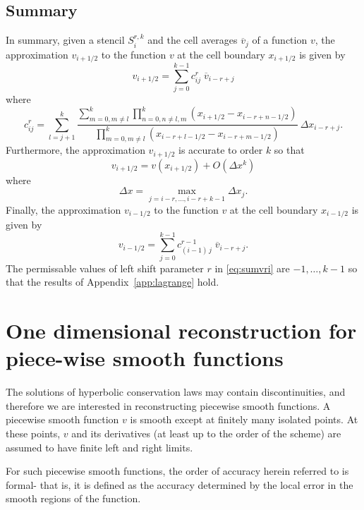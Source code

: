 \documentclass{article}
\newcommand{\xli}[0]{x_{i-1/2}}
\newcommand{\xri}[0]{x_{i+1/2}}
\newcommand{\vli}[0]{v_{i-1/2}}
\newcommand{\vri}[0]{v_{i+1/2}}
\numberwithin{equation}{section}
\begin{document}
\subsection{Summary}

In summary, given a stencil $S_i^{r,k}$ and the cell averages
$\overline{v}_j$ of a function $v$, the approximation $\vri$ to the
function $v$ at the cell boundary $\xri$ is given by
\begin{equation}
  \label{eq:sumvri}
  \vri = \sum_{j=0}^{k-1} c^r_{ij}\; \overline{v}_{i-r+j}
\end{equation}
where
\begin{equation}
  c^r_{ij} = \sum_{l=j+1}^k \frac{\sum_{m=0, m \neq l}^{k}
    \prod_{n=0, n \neq l,m}^{k} (\xri - x_{i-r+n-1/2})}{
    \prod_{m=0, m \neq l}^{k} (x_{i-r+l-1/2} - x_{i-r+m-1/2})}
    \ \Delta x_{i-r+j}.
\end{equation}
Furthermore, the approximation $\vri$ is accurate to order $k$ so that
\begin{equation*}
  \vri = v(\xri) + O(\Delta x^k)
\end{equation*}
where
\begin{equation*}
  \Delta x = \max_{j=i-r,\ldots,i-r+k-1} \Delta x_j.
\end{equation*}
Finally, the approximation $\vli$ to the function $v$ at the cell
boundary $\xli$ is given by
\begin{equation*}
  \vli = \sum_{j=0}^{k-1} c^{r-1}_{(i-1)\,j}\; \overline{v}_{i-r+j}.
\end{equation*}
The permissable values of left shift parameter $r$ in
\eqref{eq:sumvri} are $-1,\ldots,k-1$ so that the results of
Appendix~\ref{app:lagrange} hold.

\newpage
\section{One dimensional reconstruction for piece-wise smooth functions}

The solutions of hyperbolic conservation laws may contain
discontinuities, and therefore we are interested in reconstructing
piecewise smooth functions.  A piecewise smooth function $v$ is smooth
except at finitely many isolated points.  At these points, $v$ and its
derivatives (at least up to the order of the scheme) are assumed to
have finite left and right limits.

For such piecewise smooth functions, the order of accuracy herein
referred to is formal- that is, it is defined as the accuracy
determined by the local error in the smooth regions of the function.
\end{document}
